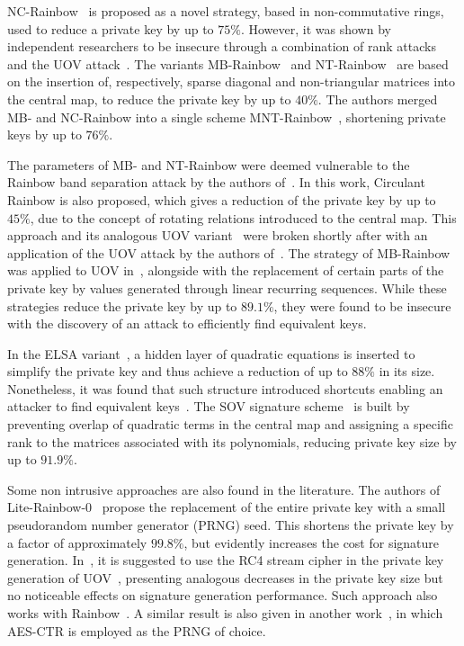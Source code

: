 \documentclass[12pt, a4paper, oneside]{memoir}
\theoremstyle{definition}
\begin{document}
NC-Rainbow~\cite{Yasuda:201202} is proposed as a novel strategy, based in non-commutative rings, used to reduce a private key by up to $75\%$. However, it was shown by independent researchers to be insecure through a combination of rank attacks and the UOV attack~\cite{Thomae:201209,Hashimoto:201302}. The variants MB-Rainbow~\cite{Yasuda:201305} and NT-Rainbow~\cite{Yasuda:201404} are based on the insertion of, respectively, sparse diagonal and non-triangular matrices into the central map, to reduce the private key by up to $40\%$. The authors merged MB- and NC-Rainbow into a single scheme MNT-Rainbow~\cite{Yasuda:201409}, shortening private keys by up to $76\%$. 

The parameters of MB- and NT-Rainbow were deemed vulnerable to the Rainbow band separation attack by the authors of~\cite{Peng:201706}. In this work, Circulant Rainbow is also proposed, which gives a reduction of the private key by up to $45\%$, due to the concept of rotating relations introduced to the central map. This approach and its analogous UOV variant~\cite{Peng:201803} were broken shortly after with an application of the UOV attack by the authors of~\cite{Hashimoto:201903}. The strategy of MB-Rainbow was applied to UOV in~\cite{Tan:201511}, alongside with the replacement of certain parts of the private key by values generated through linear recurring sequences. While these strategies reduce the private key by up to $89.1\%$, they were found to be insecure~\cite{Park:201803} with the discovery of an attack to efficiently find equivalent keys. 

In the ELSA variant~\cite{Shim:201712}, a hidden layer of quadratic equations is inserted to simplify the private key and thus achieve a reduction of up to $88\%$ in its size. Nonetheless, it was found that such structure introduced shortcuts enabling an attacker to find equivalent keys~\cite{Hashimoto:201909}. The SOV signature scheme~\cite{Shim:202001} is built by preventing overlap of quadratic terms in the central map and assigning a specific rank to the matrices associated with its polynomials, reducing private key size by up to $91.9\%$.

Some non intrusive approaches are also found in the literature. The authors of Lite-Rainbow-0~\cite{Shim:201512} propose the replacement of the entire private key with a small pseudorandom number generator (PRNG) seed. This shortens the private key by a factor of approximately $99.8\%$, but evidently increases the cost for signature generation. In~\cite{Borges:201209}, it is suggested to use the RC4 stream cipher in the private key generation of UOV~\cite{Borges:201209}, presenting analogous decreases in the private key size but no noticeable effects on signature generation performance. Such approach also works with Rainbow~\cite{Dornelles:201910}. A similar result is also given in another work~\cite{Seo:201403}, in which AES-CTR is employed as the PRNG of choice.
\end{document}

